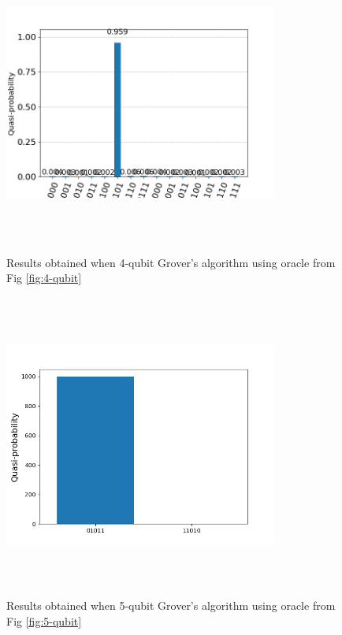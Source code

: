 \documentclass[conference]{IEEEtran}
\begin{document}
\begin{figure}[htbp]
	\centerline{\includegraphics[width=9cm,height=10cm,keepaspectratio]{4_qubit.png}}
	\caption{Results obtained when 4-qubit Grover's algorithm using oracle from Fig \ref{fig:4-qubit}}
	\label{fig:4_qubit}
\end{figure}


\begin{figure}[htbp]
	\centerline{\includegraphics[width=9cm,height=10cm,keepaspectratio]{5_qubit.png}}
	\caption{Results obtained when 5-qubit Grover's algorithm using oracle from Fig \ref{fig:5-qubit}}
	\label{fig:5_qubit}
\end{figure}
\end{document}
